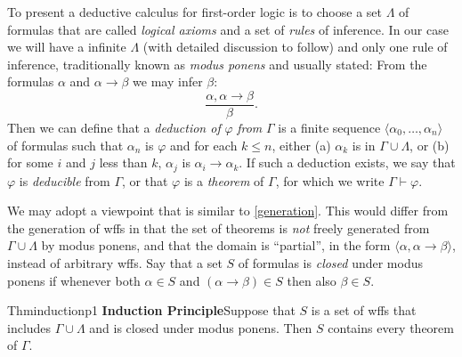 To present a deductive calculus for first-order logic is to choose a set $\Lambda$ of formulas that are called \textit{logical axioms} and a set of \textit{rules} of inference. In our case we will have a infinite $\Lambda$ (with detailed discussion to follow) and only one rule of inference, traditionally known as \textit{modus ponens} and usually stated: From the formulas $\alpha$ and $\alpha\rightarrow \beta$ we may infer $\beta$:
\[
  \frac{\alpha,\alpha\rightarrow \beta}{\beta}.
\]
Then we can define that a \textit{deduction of} $\varphi$ \textit{from} $\Gamma$ is a finite sequence $\langle \alpha_0,\dots,\alpha_n\rangle$ of formulas such that $\alpha_n$ is $\varphi$ and for each $k\leq n$, either (a) $\alpha_k$ is in $\Gamma\cup \Lambda$, or (b) for some $i$ and $j$ less than $k$, $\alpha_j$ is $\alpha_i\rightarrow \alpha_k$. If such a deduction exists, we say that $\varphi$ is \textit{deducible} from $\Gamma$, or that $\varphi$ is a \textit{theorem} of $\Gamma$, for which we write $\Gamma\vdash \varphi$.

We may adopt a viewpoint that is similar to \ref{generation}. This would differ from the generation of wffs in that the set of theorems is \textit{not} freely generated from $\Gamma\cup \Lambda$ by modus ponens, and that the domain is ``partial'', in the form $\langle \alpha,\alpha\rightarrow \beta\rangle$, instead of arbitrary wffs. Say that a set $S$ of formulas is \textit{closed} under modus ponens if whenever both $\alpha\in S$ and $(\alpha\rightarrow \beta)\in S$ then also $\beta\in S.$

\begin{reference}{Thm}{inductionp1}
  \textbf{Induction Principle}\quad Suppose that $S$ is a set of wffs that includes $\Gamma\cup \Lambda$ and is closed under modus ponens. Then $S$ contains every theorem of $\Gamma$.
\end{reference}

